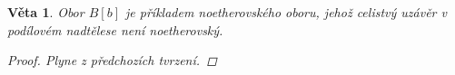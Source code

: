 \documentclass[11pt,a4paper]{article}
\newcounter{numb}
\theoremstyle{definition}
\theoremstyle{plain}
\newtheorem{veta}[numb]{Věta}
\begin{document}
\begin{veta}
	Obor $B[b]$ je příkladem noetherovského oboru, jehož celistvý uzávěr v podílovém nadtělese není noetherovský.
	
	\begin{proof}
		Plyne z předchozích tvrzení.
	\end{proof}
\end{veta}
\end{document}
